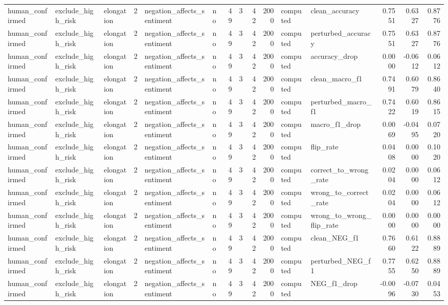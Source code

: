 \begin{tabular}{lllrllrrrrllrrr}
human_confirmed & exclude_high_risk & elongation & 2 & negation_affects_sentiment & no & 49 & 3 & 42 & 2000 & computed & clean_accuracy & 0.7551 & 0.6327 & 0.8776 \\
human_confirmed & exclude_high_risk & elongation & 2 & negation_affects_sentiment & no & 49 & 3 & 42 & 2000 & computed & perturbed_accuracy & 0.7551 & 0.6327 & 0.8776 \\
human_confirmed & exclude_high_risk & elongation & 2 & negation_affects_sentiment & no & 49 & 3 & 42 & 2000 & computed & accuracy_drop & 0.0000 & -0.0612 & 0.0612 \\
human_confirmed & exclude_high_risk & elongation & 2 & negation_affects_sentiment & no & 49 & 3 & 42 & 2000 & computed & clean_macro_f1 & 0.7491 & 0.6079 & 0.8640 \\
human_confirmed & exclude_high_risk & elongation & 2 & negation_affects_sentiment & no & 49 & 3 & 42 & 2000 & computed & perturbed_macro_f1 & 0.7422 & 0.6019 & 0.8615 \\
human_confirmed & exclude_high_risk & elongation & 2 & negation_affects_sentiment & no & 49 & 3 & 42 & 2000 & computed & macro_f1_drop & 0.0069 & -0.0495 & 0.0720 \\
human_confirmed & exclude_high_risk & elongation & 2 & negation_affects_sentiment & no & 49 & 3 & 42 & 2000 & computed & flip_rate & 0.0408 & 0.0000 & 0.1020 \\
human_confirmed & exclude_high_risk & elongation & 2 & negation_affects_sentiment & no & 49 & 3 & 42 & 2000 & computed & correct_to_wrong_rate & 0.0204 & 0.0000 & 0.0612 \\
human_confirmed & exclude_high_risk & elongation & 2 & negation_affects_sentiment & no & 49 & 3 & 42 & 2000 & computed & wrong_to_correct_rate & 0.0204 & 0.0000 & 0.0612 \\
human_confirmed & exclude_high_risk & elongation & 2 & negation_affects_sentiment & no & 49 & 3 & 42 & 2000 & computed & wrong_to_wrong_flip_rate & 0.0000 & 0.0000 & 0.0000 \\
human_confirmed & exclude_high_risk & elongation & 2 & negation_affects_sentiment & no & 49 & 3 & 42 & 2000 & computed & clean_NEG_f1 & 0.7660 & 0.6122 & 0.8889 \\
human_confirmed & exclude_high_risk & elongation & 2 & negation_affects_sentiment & no & 49 & 3 & 42 & 2000 & computed & perturbed_NEG_f1 & 0.7755 & 0.6250 & 0.8889 \\
human_confirmed & exclude_high_risk & elongation & 2 & negation_affects_sentiment & no & 49 & 3 & 42 & 2000 & computed & NEG_f1_drop & -0.0096 & -0.0730 & 0.0453 \\

\end{tabular}
